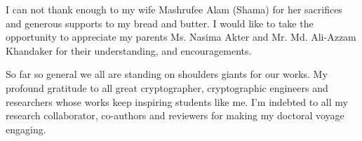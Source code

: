 \vspace{5pt}
I can not thank enough to my wife Mashrufee Alam (Shama) for her sacrifices and generous supports to my bread and butter. 
I would like to take the opportunity to appreciate my parents Ms. Nasima Akter and Mr. Md. Ali-Azzam Khandaker for their understanding, and encouragements.

\vspace{5pt}
So far so general we all are standing on shoulders giants for our works. 
My profound gratitude to all great cryptographer, cryptographic engineers and researchers whose works keep inspiring students like me.
I'm indebted to all my research collaborator, co-authors and reviewers for making my doctoral voyage engaging.

